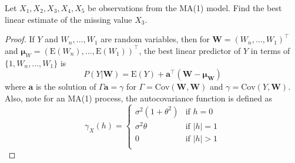 \documentclass[12pt]{article}
\theoremstyle{definition}
\newenvironment{custompbm}[1]
  {\renewcommand\theproblem{#1}\problem}
  {\endproblem}
\newcommand{\E}{\text{E}}
\newcommand{\Co}[2]{\text{Cov}\left({#1}, {#2}\right)}
\newcommand{\vect}[1]{\boldsymbol{#1}}
\begin{document}
\begin{custompbm}{4.a}
  Let $X_1, X_2, X_3, X_4, X_5$ be observations from the MA(1) model.
  Find the best linear estimate of the missing value $X_3$.
\end{custompbm}

\begin{proof}
  If $Y$ and $W_n, \dots, W_1$ are random variables, then for $\vect{W} = (W_n, \dots, W_1)^\intercal$
  and $\vect{\mu}_W= \left(\E(W_n), \dots, \E(W_1)\right)^\intercal$, the best linear
  predictor of $Y$ in terms of $\{1, W_n, \dots, W_1\}$ is
  \[
    P(Y|\vect{W}) = \E(Y) + \vect{a}^\intercal (\vect{W} - \vect{\mu_W})
  \]
  where $\vect{a}$ is the solution of $\Gamma \vect{a} = \gamma$ for
  $\Gamma = \Co{\vect{W}}{\vect{W}}$ and $\gamma = \Co{Y}{\vect{W}}$.
  Also, note for an MA(1) process, the autocovariance function is defined as
  \[
    \gamma_X(h) =
    \begin{cases}
      \sigma^2 (1 + \theta^2) & \text{if $h = 0$}\\
      \sigma^2 \theta & \text{if $|h| = 1$}\\
      0 & \text{if $|h| > 1$}\\
    \end{cases}
  \]


\end{proof}
\end{document}
